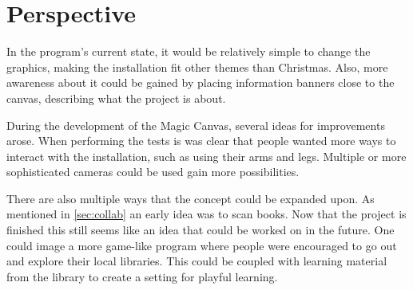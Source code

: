 \chapter{Perspective}

In the program's current state, it would be relatively simple to change the graphics, making the installation fit other themes than Christmas. Also, more awareness about it could be gained by placing information banners close to the canvas, describing what the project is about.

During the development of the Magic Canvas, several ideas for improvements arose. When performing the tests is was clear that people wanted more ways to interact with the installation, such as using their arms and legs. Multiple or more sophisticated cameras could be used gain more possibilities. 

There are also multiple ways that the concept could be expanded upon. As mentioned in \ref{sec:collab} an early idea was to scan books. Now that the project is finished this still seems like an idea that could be worked on in the future. One could image a more game-like program where people were encouraged to go out and explore their local libraries. This could be coupled with learning material from the library to create a setting for playful learning.